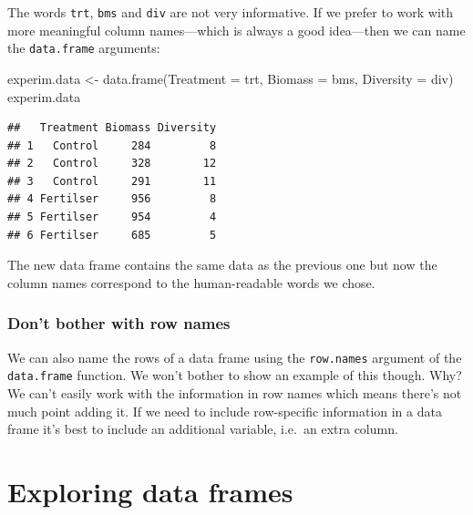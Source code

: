 \documentclass[
]{book}
\newenvironment{Shaded}{\begin{snugshade}}{\end{snugshade}}
\newcommand{\AttributeTok}[1]{\textcolor[rgb]{0.77,0.63,0.00}{#1}}
\newcommand{\FunctionTok}[1]{\textcolor[rgb]{0.00,0.00,0.00}{#1}}
\newcommand{\NormalTok}[1]{#1}
\newcommand{\OtherTok}[1]{\textcolor[rgb]{0.56,0.35,0.01}{#1}}
\newenvironment{greybox}{
  \definecolor{shadecolor}{rgb}{0.95,0.95,0.95}  %
  \color{black}
  \begin{shaded}}
 {\end{shaded}}
\newenvironment{infobox}[1]
  {
  \begin{itemize}
  \renewcommand{\labelitemi}{
    \raisebox{-.7\height}[0pt][0pt]{
      {\setkeys{Gin}{width=3em,keepaspectratio}
        \texttt{[image: images/\#1]}}
    }
  }
  \setlength{\fboxsep}{1em}
  \begin{greybox}
  \item
  }
  {
  \end{greybox}
  \end{itemize}
  }
\begin{document}
The words \texttt{trt}, \texttt{bms} and \texttt{div} are not very informative. If we prefer to work with more meaningful column names---which is always a good idea---then we can name the \texttt{data.frame} arguments:

\begin{Shaded}
\begin{Highlighting}[]
\NormalTok{experim.data }\OtherTok{\textless{}{-}} \FunctionTok{data.frame}\NormalTok{(}\AttributeTok{Treatment =}\NormalTok{ trt, }\AttributeTok{Biomass =}\NormalTok{ bms, }\AttributeTok{Diversity =}\NormalTok{ div)}
\NormalTok{experim.data}
\end{Highlighting}
\end{Shaded}

\begin{verbatim}
##   Treatment Biomass Diversity
## 1   Control     284         8
## 2   Control     328        12
## 3   Control     291        11
## 4 Fertilser     956         8
## 5 Fertilser     954         4
## 6 Fertilser     685         5
\end{verbatim}

The new data frame contains the same data as the previous one but now the column names correspond to the human-readable words we chose.

\begin{infobox}{warning}

\hypertarget{dont-bother-with-row-names}{%
\subsubsection*{Don't bother with row names}\label{dont-bother-with-row-names}}

We can also name the rows of a data frame using the \texttt{row.names} argument of the \texttt{data.frame} function. We won't bother to show an example of this though. Why? We can't easily work with the information in row names which means there's not much point adding it. If we need to include row-specific information in a data frame it's best to include an additional variable, i.e.~an extra column.

\end{infobox}

\hypertarget{exploring-data-frames}{%
\section{Exploring data frames}\label{exploring-data-frames}}
\end{document}
